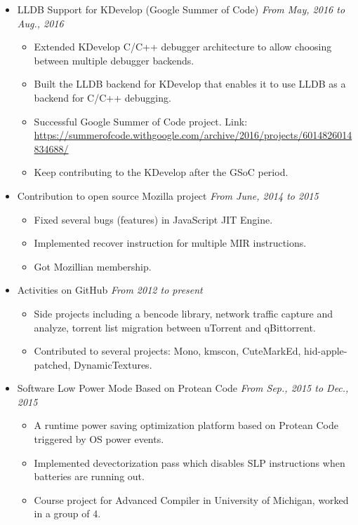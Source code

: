 \documentclass[a4paper,11pt]{article}
\begin{document}
\begin{itemize}
    \item LLDB Support for KDevelop (Google Summer of Code) \hfill \textit{From May, 2016 to Aug., 2016}
    \begin{itemize}
        \item Extended KDevelop C/C++ debugger architecture to allow choosing between multiple debugger 
backends.
        \item Built the LLDB backend for KDevelop that enables it to use LLDB as a backend for C/C++ 
debugging.
\item Successful Google Summer of Code project. Link:
\url{https://summerofcode.withgoogle.com/archive/2016/projects/6014826014834688/}
        \item Keep contributing to the KDevelop after the GSoC period.
    \end{itemize}

    \item Contribution to open source Mozilla project \hfill \textit{From June, 2014 to 2015}
    \begin{itemize}
        \item Fixed several bugs (features) in JavaScript JIT Engine.
        \item Implemented recover instruction for multiple MIR instructions.
        \item Got Mozillian membership.
    \end{itemize}

    \item Activities on GitHub \hfill \textit{From 2012 to present}
    \begin{itemize}
        \item Side projects including a bencode library, network traffic capture and analyze, torrent list
migration between uTorrent and qBittorrent.
        \item Contributed to several projects: Mono, kmscon, CuteMarkEd, hid-apple-patched, DynamicTextures.
    \end{itemize}

    \item Software Low Power Mode Based on Protean Code \hfill \textit{From Sep., 2015 to Dec., 2015}
    \begin{itemize}
        \item A runtime power saving optimization platform based on Protean Code triggered by OS power events.
        \item Implemented devectorization pass which disables SLP instructions when batteries are running out.
        \item Course project for Advanced Compiler in University of Michigan, worked in a group of 4.
    \end{itemize}


\end{itemize}
\end{document}
